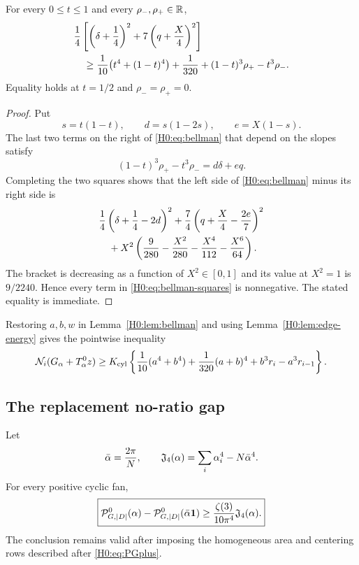 \begin{lemma}\label{H0:lem:bellman}
For every $0\le t\le1$ and every $\rho_-,\rho_+\in\mathbb R$,
\begin{align}
 &\frac14\left[\left(\delta+\frac14\right)^2
 +7\left(q+\frac X4\right)^2\right]\notag\\
 &\quad\ge
 \frac1{10}\bigl(t^4+(1-t)^4\bigr)+\frac1{320}
 +(1-t)^3\rho_+-t^3\rho_- .
 \label{H0:eq:bellman}
\end{align}
Equality holds at $t=1/2$ and $\rho_-=\rho_+=0$.
\end{lemma}

\begin{proof}
Put
\begin{equation}
 s=t(1-t),\qquad
 d=s(1-2s),\qquad e=X(1-s).
\end{equation}
The last two terms on the right of \eqref{H0:eq:bellman} that depend on the
slopes satisfy
\begin{equation}
 (1-t)^3\rho_+-t^3\rho_-=d\delta+eq.
\end{equation}
Completing the two squares shows that the left side of
\eqref{H0:eq:bellman} minus its right side is
\begin{align}
 &\frac14\left(\delta+\frac14-2d\right)^2
 +\frac74\left(q+\frac X4-\frac{2e}{7}\right)^2\notag\\
 &\quad+X^2\left(
 \frac9{280}-\frac{X^2}{280}
 -\frac{X^4}{112}-\frac{X^6}{64}\right).
 \label{H0:eq:bellman-squares}
\end{align}
The bracket is decreasing as a function of $X^2\in[0,1]$ and its value at
$X^2=1$ is $9/2240$.  Hence every term in
\eqref{H0:eq:bellman-squares} is nonnegative.  The stated equality is immediate.
\end{proof}

Restoring $a,b,w$ in Lemma~\ref{H0:lem:bellman} and using
Lemma~\ref{H0:lem:edge-energy} gives the pointwise inequality
\begin{equation}\label{H0:eq:physical-bellman}
 \mathcal N_i(G_\alpha+T_\alpha^0z)
 \ge K_{\rm cyl}\left\{\frac1{10}(a^4+b^4)
 +\frac1{320}(a+b)^4+b^3r_i-a^3r_{i-1}\right\}.
\end{equation}

\subsection{The replacement no-ratio gap}

\begin{theorem}\label{H0:thm:dot-gap}
Let
\begin{equation}
 \bar\alpha=\frac{2\pi}{N},
 \qquad
 \mathfrak J_4(\alpha)=\sum_i\alpha_i^4-N\bar\alpha^4.
\end{equation}
For every positive cyclic fan,
\begin{equation}\label{H0:eq:gap}
 \boxed{
 \mathcal P_{G,|D|}^0(\alpha)-\mathcal P_{G,|D|}^0(\bar\alpha\mathbf1)
 \ge\frac{\zeta(3)}{10\pi^4}\mathfrak J_4(\alpha).}
\end{equation}
The conclusion remains valid after imposing the homogeneous area and
centering rows described after \eqref{H0:eq:PGplus}.
\end{theorem}

